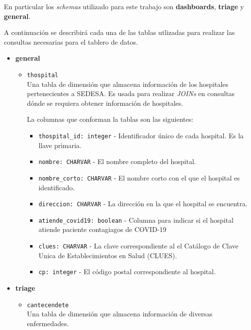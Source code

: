 En particular los \textit{schemas} utilizado para este trabajo son \textbf{dashboards}, \textbf{triage} y \textbf{general}.
\newpage

A continuación se describirá cada una de las tablas utlizadas para realizar las consultas necesarias para el tablero de datos.

\begin{itemize}
    \item \textbf{general}
        \begin{itemize}
            \item \texttt{thospital}\\
            Una tabla de dimensión que almacena información de los hospitales pertenecientes a SEDESA. Es usada para realizar \textit{JOINs} en consultas dónde se requiera obtener información de hospitales.

            La columnas que conforman la tablas son las siguientes:

            \begin{itemize}
                \item \texttt{thospital\_id: integer} - Identificador único de cada hospital. Es la llave primaria.
                
                \item \texttt{nombre: CHARVAR} - El nombre completo del hospital.
            
                \item \texttt{nombre\_corto: CHARVAR} - El nombre corto con el que el hospital es identificado.
                
                \item \texttt{direccion: CHARVAR} - La dirección en la que el hospital se encuentra.
                \item \texttt{atiende\_covid19: boolean} - Columna para indicar si el hospital atiende paciente contagiagos de COVID-19
                \item \texttt{clues: CHARVAR} - La clave correspondiente al el Catálogo de Clave Unica de Establecimientos en Salud (CLUES).
                \item \texttt{cp: integer} - El código postal correspondiente al hospital.
            \end{itemize}


            
        \end{itemize}


    \item \textbf{triage}
    \begin{itemize}
        \item \texttt{cantecendete}\\
        Una tabla de dimensión que almacena información de diversas enfermedades.\\


\end{itemize}
\end{itemize}
